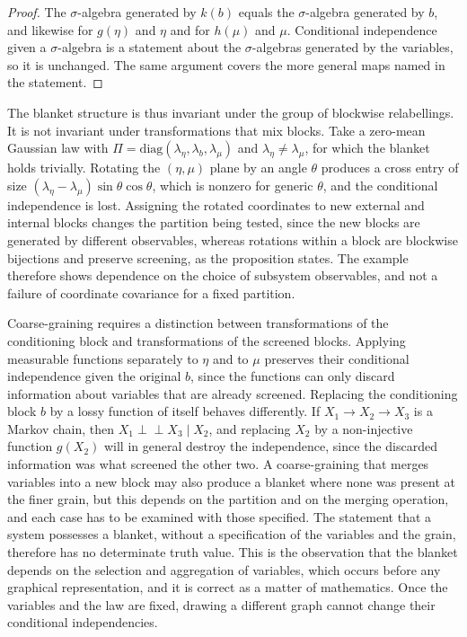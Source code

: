 \documentclass[11pt]{article}
\theoremstyle{definition}
\newcommand{\Ind}{\perp\!\!\!\perp}
\begin{document}
\begin{proof}
The $\sigma$-algebra generated by $k(b)$ equals the $\sigma$-algebra generated by $b$, and likewise for $g(\eta)$ and $\eta$ and for $h(\mu)$ and $\mu$. Conditional independence given a $\sigma$-algebra is a statement about the $\sigma$-algebras generated by the variables, so it is unchanged. The same argument covers the more general maps named in the statement.
\end{proof}

The blanket structure is thus invariant under the group of blockwise relabellings. It is not invariant under transformations that mix blocks. Take a zero-mean Gaussian law with $\Pi=\mathrm{diag}(\lambda_\eta,\lambda_b,\lambda_\mu)$ and $\lambda_\eta\neq\lambda_\mu$, for which the blanket holds trivially. Rotating the $(\eta,\mu)$ plane by an angle $\theta$ produces a cross entry of size $(\lambda_\eta-\lambda_\mu)\sin\theta\cos\theta$, which is nonzero for generic $\theta$, and the conditional independence is lost. Assigning the rotated coordinates to new external and internal blocks changes the partition being tested, since the new blocks are generated by different observables, whereas rotations within a block are blockwise bijections and preserve screening, as the proposition states. The example therefore shows dependence on the choice of subsystem observables, and not a failure of coordinate covariance for a fixed partition.

Coarse-graining requires a distinction between transformations of the conditioning block and transformations of the screened blocks. Applying measurable functions separately to $\eta$ and to $\mu$ preserves their conditional independence given the original $b$, since the functions can only discard information about variables that are already screened. Replacing the conditioning block $b$ by a lossy function of itself behaves differently. If $X_1\to X_2\to X_3$ is a Markov chain, then $X_1\Ind X_3\mid X_2$, and replacing $X_2$ by a non-injective function $g(X_2)$ will in general destroy the independence, since the discarded information was what screened the other two. A coarse-graining that merges variables into a new block may also produce a blanket where none was present at the finer grain, but this depends on the partition and on the merging operation, and each case has to be examined with those specified. The statement that a system possesses a blanket, without a specification of the variables and the grain, therefore has no determinate truth value. This is the observation that the blanket depends on the selection and aggregation of variables, which occurs before any graphical representation, and it is correct as a matter of mathematics. Once the variables and the law are fixed, drawing a different graph cannot change their conditional independencies.
\end{document}
